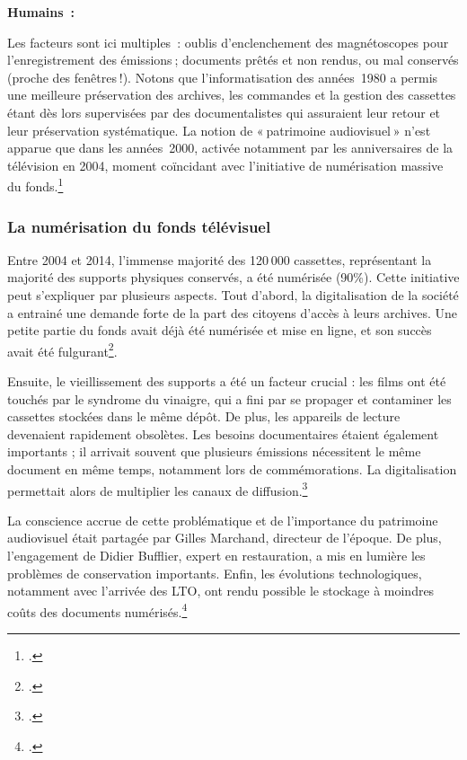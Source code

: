 \textbf{Humains :}

Les facteurs sont ici multiples : oublis d’enclenchement des magnétoscopes pour l’enregistrement des émissions ; documents prêtés et non rendus, ou mal conservés (proche des fenêtres !). Notons que l’informatisation des années 1980 a permis une meilleure préservation des archives, les commandes et la gestion des cassettes étant dès lors supervisées par des documentalistes qui assuraient leur retour et leur préservation systématique. La notion de « patrimoine audiovisuel » n’est apparue que dans les années 2000, activée notamment par les anniversaires de la télévision en 2004, moment coïncidant avec l’initiative de numérisation massive du fonds.\footcite{barcella2024a}

\subsubsection{La numérisation du fonds télévisuel}

Entre 2004 et 2014, l’immense majorité des 120 000 cassettes, représentant la majorité des supports physiques conservés, a été numérisée (90\%). Cette initiative peut s’expliquer par plusieurs aspects. Tout d’abord, la digitalisation de la société a entrainé une demande forte de la part des citoyens d’accès à leurs archives. Une petite partie du fonds avait déjà été numérisée et mise en ligne, et son succès avait été fulgurant\footcite{rezzonico2023}.

Ensuite, le vieillissement des supports a été un facteur crucial : les films ont été touchés par le syndrome du vinaigre, qui a fini par se propager et contaminer les cassettes stockées dans le même dépôt. De plus, les appareils de lecture devenaient rapidement obsolètes. Les besoins documentaires étaient également importants ; il arrivait souvent que plusieurs émissions nécessitent le même document en même temps, notamment lors de commémorations. La digitalisation permettait alors de multiplier les canaux de diffusion.\footcite{barcella2024a}

La conscience accrue de cette problématique et de l’importance du patrimoine audiovisuel était partagée par Gilles Marchand, directeur de l’époque. De plus, l’engagement de Didier Bufflier, expert en restauration, a mis en lumière les problèmes de conservation importants. Enfin, les évolutions technologiques, notamment avec l’arrivée des LTO, ont rendu possible le stockage à moindres coûts des documents numérisés.\footcite{barcella2024a}

